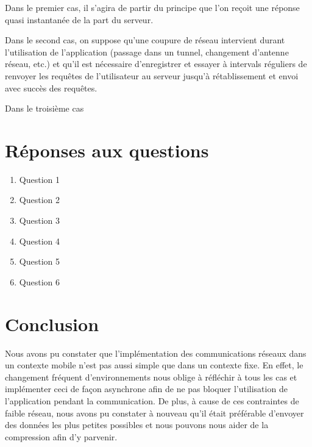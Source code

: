 \documentclass[a4paper]{article}
\begin{document}
Dans le premier cas, il s'agira de partir du principe que l'on reçoit une réponse quasi instantanée de la part du serveur.

Dans le second cas, on suppose qu'une coupure de réseau intervient durant l'utilisation de l'application (passage dans un tunnel, changement d'antenne réseau, etc.) et qu'il est nécessaire d'enregistrer et essayer à intervals réguliers de renvoyer les requêtes de l'utilisateur au serveur jusqu'à rétablissement et envoi avec succès des requêtes.

Dans le troisième cas 

\section{Réponses aux questions}

\begin{enumerate}
	\item Question 1
	
    \item Question 2
    
    \item Question 3
    
    \item Question 4
    
    \item Question 5
    
    \item Question 6
    
\end{enumerate}

\section{Conclusion}

Nous avons pu constater que l'implémentation des communications réseaux dans un contexte mobile n'est pas aussi simple que dans un contexte fixe. En effet, le changement fréquent d'environnements nous oblige à réfléchir à tous les cas et implémenter ceci de façon asynchrone afin de ne pas bloquer l'utilisation de l'application pendant la communication. De plus, à cause de ces contraintes de faible réseau, nous avons pu constater à nouveau qu'il était préférable d'envoyer des données les plus petites possibles et nous pouvons nous aider de la compression afin d'y parvenir.
\end{document}

